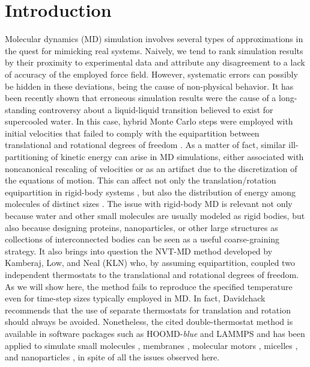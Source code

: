 \documentclass[
	aip,
	jcp,
	reprint,
]{revtex4-1}
\begin{document}
\section{Introduction}

Molecular dynamics (MD) simulation involves several types of approximations in the quest for mimicking real systems.
Naively, we tend to rank simulation results by their proximity to experimental data and attribute any disagreement to a lack of accuracy of the employed force field.
However, systematic errors can possibly be hidden in these deviations, being the cause of non-physical behavior.
It has been recently shown \cite{Palmer_2018} that erroneous simulation results \cite{Limmer_2011, Limmer_2013} were the cause of a long-standing controversy \cite{Smart_2018} about a liquid-liquid transition believed to exist for supercooled water.
In this case, hybrid Monte Carlo steps were employed with initial velocities that failed to comply with the equipartition between translational and rotational degrees of freedom \cite{Palmer_2018}.
As a matter of fact, similar ill-partitioning of kinetic energy can arise in MD simulations, either associated with noncanonical rescaling of velocities \cite{Braun_2018} or as an artifact due to the discretization of the equations of motion.
This can affect not only the translation/rotation equipartition in rigid-body systems \cite{Davidchack_2010, Silveira_2017}, but also the distribution of energy among molecules of distinct sizes \cite{Eastwood_2010}.
The issue with rigid-body MD is relevant not only because water \cite{Jorgensen_1983} and other small molecules are usually modeled as rigid bodies, but also because designing proteins, nanoparticles, or other large structures as collections of interconnected bodies \cite{Miller_2002, Knorowski_2012, Patra_2013} can be seen as a useful coarse-graining strategy.
It also brings into question the NVT-MD method developed by Kamberaj, Low, and Neal \cite{Kamberaj_2005} (KLN) who, by assuming equipartition, coupled two independent thermostats to the translational and rotational degrees of freedom.
As we will show here, the method fails to reproduce the specified temperature even for time-step sizes typically employed in MD.
In fact, Davidchack \cite{Davidchack_2010} recommends that the use of separate thermostats for translation and rotation should always be avoided.
Nonetheless, the cited double-thermostat method is available in software packages such as HOOMD-\textit{blue}\cite{Anderson_2008} and LAMMPS\cite{Plimpton_1995} and has been applied to simulate small molecules \cite{Geiger_2013, Aimoli_2014, Aimoli_2014_2}, membranes \cite{Bucior_2012}, molecular motors \cite{Akimov_2012}, micelles \cite{Yan_2008}, and nanoparticles \cite{Patra_2014}, in spite of all the issues observed here.
\end{document}
